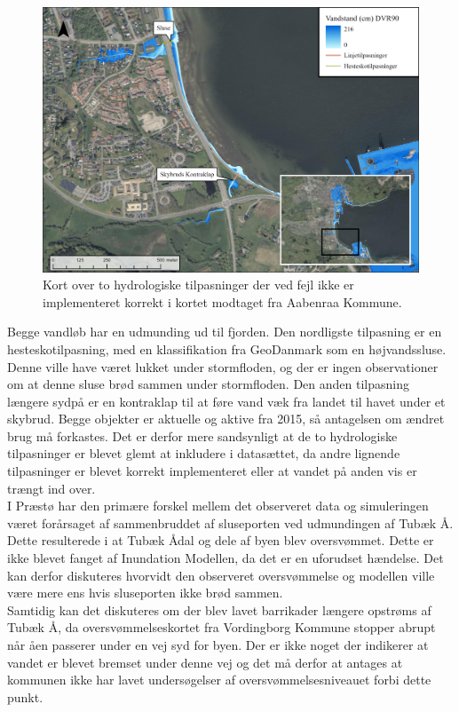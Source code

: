 \begin{figure}[H]
    \centering
    \includegraphics[width=0.8\linewidth]{images/diskussion/tilpasnings_error.jpg}
    \caption{Kort over to hydrologiske tilpasninger der ved fejl ikke er implementeret korrekt i kortet modtaget fra Aabenraa Kommune.}
    \label{Figur: Tilpasnings fejl}
\end{figure}
Begge vandløb har en udmunding ud til fjorden. Den nordligste tilpasning er en hesteskotilpasning, med en klassifikation fra GeoDanmark som en højvandssluse. Denne ville have været lukket under stormfloden, og der er ingen observationer om at denne sluse brød sammen under stormfloden. Den anden tilpasning længere sydpå er en kontraklap til at føre vand væk fra landet til havet under et skybrud. Begge objekter er aktuelle og aktive fra 2015, så antagelsen om ændret brug må forkastes. Det er derfor mere sandsynligt at de to hydrologiske tilpasninger er blevet glemt at inkludere i datasættet, da andre lignende tilpasninger er blevet korrekt implementeret eller at vandet på anden vis er trængt ind over. \\  

I Præstø har den primære forskel mellem det observeret data og simuleringen været forårsaget af sammenbruddet af sluseporten ved udmundingen af Tubæk Å. Dette resulterede i at Tubæk Ådal og dele af byen blev oversvømmet. Dette er ikke blevet fanget af Inundation Modellen, da det er en uforudset hændelse. Det kan derfor diskuteres hvorvidt den observeret oversvømmelse og modellen ville være mere ens hvis sluseporten ikke brød sammen. \\
Samtidig kan det diskuteres om der blev lavet barrikader længere opstrøms af Tubæk Å, da oversvømmelseskortet fra Vordingborg Kommune stopper abrupt når åen passerer under en vej syd for byen. Der er ikke noget der indikerer at vandet er blevet bremset under denne vej og det må derfor at antages at kommunen ikke har lavet undersøgelser af oversvømmelsesniveauet forbi dette punkt. \\

